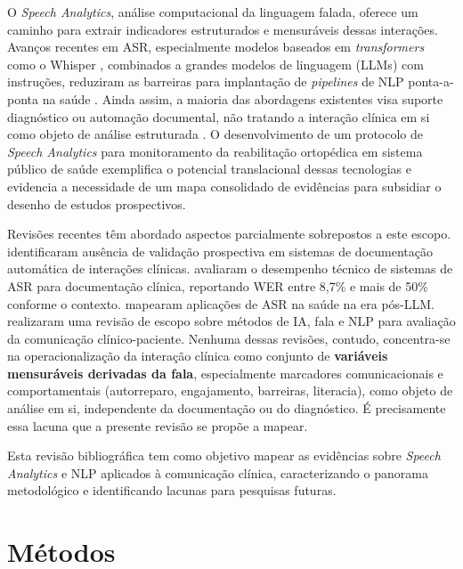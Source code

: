 \documentclass[a4paper,fleqn]{cas-sc}
\begin{document}
O \textit{Speech Analytics}, análise computacional da linguagem falada,
oferece um caminho para extrair indicadores estruturados e mensuráveis
dessas interações. Avanços recentes em ASR, especialmente modelos baseados
em \textit{transformers} como o Whisper \citep{Radford2023}, combinados a
grandes modelos de linguagem (LLMs) com instruções, reduziram as barreiras
para implantação de \textit{pipelines} de NLP ponta-a-ponta na saúde
\citep{Klusty2025}. Ainda assim, a maioria das abordagens existentes visa
suporte diagnóstico ou automação documental, não tratando a interação clínica
em si como objeto de análise estruturada \citep{vanBuchem2021}. O desenvolvimento
de um protocolo de \textit{Speech Analytics} para monitoramento da reabilitação
ortopédica em sistema público de saúde \citep{BaenaNeto2026} exemplifica o
potencial translacional dessas tecnologias e evidencia a necessidade de um
mapa consolidado de evidências para subsidiar o desenho de estudos prospectivos.

Revisões recentes têm abordado aspectos parcialmente sobrepostos a este
escopo. \citet{Falcetta2023} identificaram ausência
de validação prospectiva em sistemas de documentação automática de
interações clínicas. \citet{Ng2025} avaliaram o desempenho
técnico de sistemas de ASR para documentação clínica, reportando WER
entre 8,7\% e mais de 50\% conforme o contexto. \citet{Alabbad2026}
mapearam aplicações de ASR na saúde na era
pós-LLM. \citet{Albert2024} realizaram uma revisão de
escopo sobre métodos de IA, fala e NLP para avaliação da comunicação
clínico-paciente. Nenhuma dessas revisões, contudo, concentra-se na
operacionalização da interação clínica como conjunto de \textbf{variáveis
mensuráveis derivadas da fala}, especialmente marcadores comunicacionais
e comportamentais (autorreparo, engajamento, barreiras, literacia), como
objeto de análise em si, independente da documentação ou do diagnóstico.
É precisamente essa lacuna que a presente revisão se propõe a mapear.

Esta revisão bibliográfica tem como objetivo mapear as evidências sobre
\textit{Speech Analytics} e NLP aplicados à comunicação clínica,
caracterizando o panorama metodológico e identificando lacunas para
pesquisas futuras.

\section{Métodos}
\label{sec:metodos}
\end{document}
